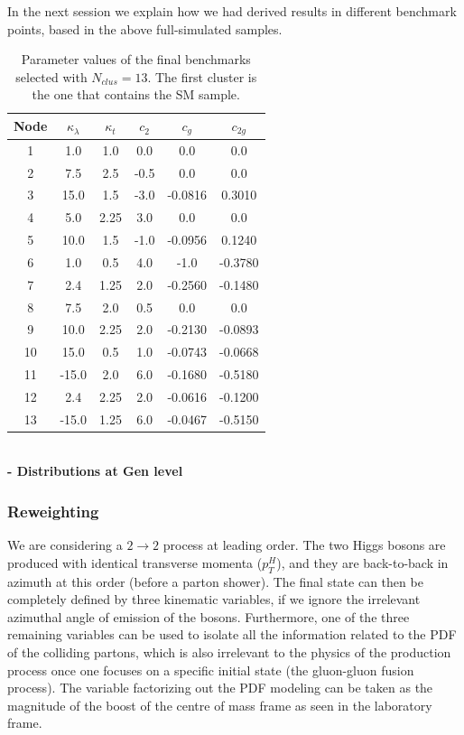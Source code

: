 In the next session we explain how we had derived results in different benchmark points, based in the above full-simulated samples. \\


\begin{table}
\centering
\small{
\begin{tabular}{|c||c|c|c|c|c|}
\hline
Node & $\kappa_{\lambda}$ & $\kappa_{t}$ & $c_2$ & $c_g$ & $c_{2g}$ \\\hline
1  &   1.0 & 1.0  &  0.0 &  0.0 &  0.0  \\ \hline
2  &   7.5 & 2.5  & -0.5 &  0.0    &  0.0      \\ \hline
3  &  15.0 & 1.5  & -3.0 & -0.0816 &  0.3010   \\\hline
4  &   5.0 & 2.25 &  3.0 &  0.0    &  0.0     \\\hline
5  &  10.0 & 1.5  & -1.0 & -0.0956 &  0.1240  \\ \hline
6  &   1.0 & 0.5  &  4.0 & -1.0    & -0.3780  \\ \hline
7  &   2.4 & 1.25 &  2.0 & -0.2560 & -0.1480  \\ \hline
8  &   7.5 & 2.0  &  0.5 &  0.0    &  0.0     \\ \hline
9  &  10.0 & 2.25 &  2.0 & -0.2130 & -0.0893  \\ \hline
10 &  15.0 & 0.5  &  1.0 & -0.0743 & -0.0668  \\ \hline
11 & -15.0 & 2.0  &  6.0 & -0.1680 & -0.5180  \\ \hline
12 &   2.4 & 2.25 &  2.0 & -0.0616 & -0.1200   \\ \hline
13 & -15.0 & 1.25 &  6.0 & -0.0467 & -0.5150   \\ \hline
\end{tabular}
}
\caption{\small Parameter values of the final benchmarks selected with $N_{clus} = 13$. 
The first cluster is the one that contains the SM sample. 
\label{tab:bench_old}}
\end{table} 

\mbox{}\\{\bf - Distributions at Gen level}

\subsubsection{Reweighting}
\label{sec:rewei}

We are considering a $2\to 2$ process at leading order. The two Higgs bosons are produced with identical transverse momenta ($p_{T}^{H}$), and they are back-to-back in azimuth at this order (before a parton shower). The final state can then be completely defined by three kinematic variables, if we ignore the irrelevant azimuthal angle of emission of the bosons. Furthermore, one of the three remaining variables can be used to isolate all the information related to the PDF of the colliding partons, which is also irrelevant to the physics of the production process once one focuses on a specific initial state (the gluon-gluon fusion process). The variable factorizing out the PDF modeling can be taken as the magnitude of the boost of the centre of mass frame as seen in the laboratory frame. 

